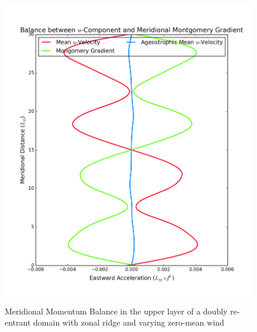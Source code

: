 \documentclass[12pt,a4paper]{report}
\begin{document}
 
  \begin{figure}
  	\centering
  	\begin{minipage}[b]{0.45\linewidth}
  		\centering
  		\includegraphics[width=\linewidth ]{vgeo_3}
  		\caption{Meridional Momentum Balance in the upper layer of 
  			a doubly re-entrant domain with 
  			zonal ridge and varying zero-mean wind}
  		\label{fig:vgeolayer3}
  	\end{minipage}
  	\quad
  	\begin{minipage}[b]{0.45\linewidth}
  		\centering

\end{minipage}
\end{figure}
\end{document}
